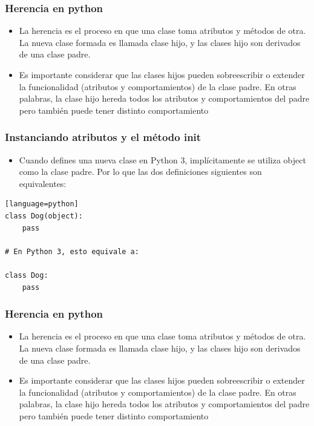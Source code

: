 \documentclass[hyperref={pdfpagelabels=false},xcolor=pst,pdf,fragile]{beamer}
\begin{document}
\begin{frame}[fragile]
    \frametitle{Herencia en python}
    \pause
    \begin{itemize}
    \item La herencia es el proceso en que una clase toma atributos y métodos de otra. La nueva clase formada es llamada clase hijo, y las clases hijo son derivados de una clase padre.
    \item Es importante considerar que las clases hijos pueden sobreescribir o extender la funcionalidad (atributos y comportamientos) de la clase padre. En otras palabras, la clase hijo hereda todos los atributos y comportamientos del padre pero también puede tener distinto comportamiento
    \end{itemize}
\end{frame}

\begin{frame}[fragile]
    \frametitle{Instanciando atributos y el método init}
    \pause
    \begin{itemize}
    \item Cuando defines una nueva clase en Python 3, implícitamente se utiliza object como la clase padre. Por lo que las dos definiciones siguientes son equivalentes:
    \end{itemize}
    \begin{lstlisting}[basicstyle=\tiny][language=python]
class Dog(object):
    pass

# En Python 3, esto equivale a:

class Dog:
    pass
    \end{lstlisting}
\end{frame}

\begin{frame}
    \frametitle{Herencia en python}
    \pause
    \begin{itemize}
    \item La herencia es el proceso en que una clase toma atributos y métodos de otra. La nueva clase formada es llamada clase hijo, y las clases hijo son derivados de una clase padre.
    \item Es importante considerar que las clases hijos pueden sobreescribir o extender la funcionalidad (atributos y comportamientos) de la clase padre. En otras palabras, la clase hijo hereda todos los atributos y comportamientos del padre pero también puede tener distinto comportamiento
    \end{itemize}
\end{frame}
\end{document}
